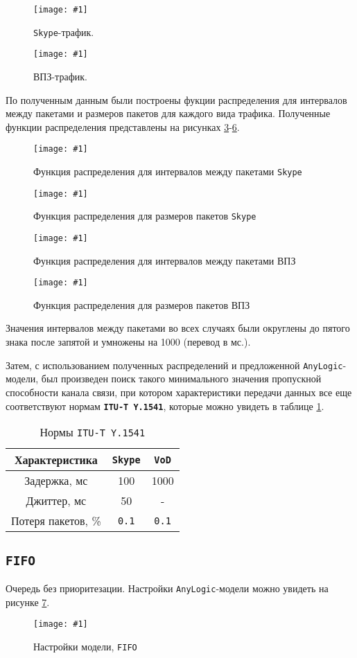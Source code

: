 \documentclass[12pt, a4paper]{article}
\newcommand{\figc}[4]{
  \begin{figure}[H]
  \begin{center}
    \texttt{[image: \#1]}
    \caption{#2}
    \label{fig:#3}
  \end{center}
  \end{figure}
}
\begin{document}
\figc{skype_traffic}{\texttt{Skype}-трафик.}{s_t}{1.0}
\figc{vod_traffic}{ВПЗ-трафик.}{v_t}{0.8}

По полученным данным были построены фукции распределения для интервалов
между пакетами и размеров пакетов для каждого вида трафика. Полученные
функции распределения представлены на рисунках \ref{fig:s_f}-\ref{fig:v_s}.

\figc{charts/skype_f_time}{Функция распределения для интервалов между пакетами \texttt{Skype}}{s_f}{0.75}
\figc{charts/skype_f_size}{Функция распределения для размеров пакетов \texttt{Skype}}{s_s}{0.75}
\figc{charts/vod_f_time}{Функция распределения для интервалов между пакетами ВПЗ}{v_f}{0.75}
\figc{charts/vod_f_size}{Функция распределения для размеров пакетов ВПЗ}{v_s}{0.75}

Значения интервалов между пакетами во всех случаях были округлены до
пятого знака после запятой и умножены на 1000 (перевод в мс.).

Затем, с использованием полученных распределений и предложенной
\texttt{AnyLogic}-модели, был произведен поиск такого минимального значения
пропускной способности канала связи, при котором характеристики передачи
данных все еще соответствуют нормам \textbf{\texttt{ITU-T Y.1541}}, которые можно
увидеть в таблице \ref{Tab:itu}.

\begin{table}[H]
  \begin{center}
  \caption{Нормы \texttt{ITU-T Y.1541}}
  \begin{tabular}{| c | c | c |}
    \hline
    Характеристика & \texttt{Skype} & \texttt{VoD}\\\hline
    Задержка, мс & 100 & 1000\\\hline
    Джиттер, мс & 50 & -\\\hline
    Потеря пакетов, \% & \texttt{0.1} & \texttt{0.1}\\\hline
  \end{tabular}
  \label{Tab:itu}
  \end{center}
\end{table}

\subsection{\texttt{FIFO}}

Очередь без приоритезации. Настройки \texttt{AnyLogic}-модели можно увидеть
на рисунке \ref{fig:f_set}.

\figc{bp/settings}{Настройки модели, \texttt{FIFO}}{f_set}{1.0}
\end{document}
